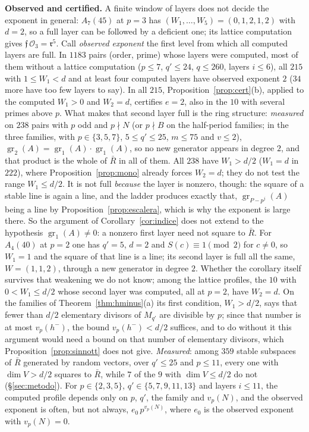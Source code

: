 \documentclass[11pt,a4paper]{article}
\theoremstyle{definition}
\newcommand{\cO}{\mathcal{O}}
\newcommand{\cf}{\mathfrak{f}}
\newcommand{\rad}{\mathfrak{r}}
\newcommand{\gr}{\operatorname{gr}}
\begin{document}
\noindent\textbf{Observed and certified.} A finite window of layers does not decide the exponent in general:
$A_7(45)$ at $p=3$ has $(W_1,\dots,W_5)=(0,1,2,1,2)$ with $d=2$, so a full layer can be followed by a deficient
one; its lattice computation gives $\cf\,\cO_3=\rad^5$. Call \emph{observed exponent} the first level from which
all computed layers are full. In $1183$ pairs (order, prime) whose layers were computed, most of them without a lattice computation
($p\le7$, $q'\le24$, $q\le260$, layers $i\le6$), all $215$ with $1\le W_1<d$ and at least four computed layers
have observed exponent $2$ ($34$ more have too few layers to say). In all $215$, Proposition~\ref{prop:cert}(b),
applied to the computed $W_1>0$ and $W_2=d$, certifies $e=2$, also in the $10$ with several primes above $p$. What
makes that second layer full is the ring structure: \emph{measured} on $238$ pairs with $p$ odd and $p\nmid N$
(or $p\nmid B$ on the half-period families; in the three families, with $p\in\{3,5,7\}$, $5\le q'\le25$, $m\le75$
and $v\le2$), $\gr_2(A)=\gr_1(A)\cdot\gr_1(A)$, so no new generator appears in degree $2$, and that product is the
whole of $\bar R$ in all of them. All $238$ have $W_1>d/2$ ($W_1=d$ in $222$), where Proposition~\ref{prop:mono}
already forces $W_2=d$; they do not test the range $W_1\le d/2$. It is not full \emph{because} the layer is nonzero, though: the square of a stable line is again a
line, and the ladder produces exactly that, $\gr_{P-p^j}(A)$ being a line by Proposition~\ref{prop:escalera}, which
is why the exponent is large there. So the argument of Corollary~\ref{cor:indice} does not extend to the
hypothesis $\gr_1(A)\neq0$: a nonzero first layer need not square to $\bar R$. For $A_4(40)$ at $p=2$ one has $q'=5$, $d=2$ and
$S(c)\equiv1\pmod2$ for $c\ne0$, so $W_1=1$ and the square of that line is a line; its second layer is full all the same,
$W=(1,1,2)$, through a new generator in degree $2$. Whether the corollary itself survives
that weakening we do not know; among the lattice profiles, the $10$ with $0<W_1\le d/2$ whose second layer
was computed, all at $p=2$, have $W_2=d$. On the families of
Theorem~\ref{thm:hminus}(a) its first condition, $W_1>d/2$, says that fewer than $d/2$ elementary divisors of $M_{q'}$
are divisible by $p$; since that number is at most $v_p(h^-)$, the bound $v_p(h^-)<d/2$ suffices, and to do without it
this argument would need a bound on that number of elementary divisors, which Proposition~\ref{prop:sinnott} does not give. \emph{Measured}: among $359$ stable subspaces of $\bar R$ generated by random
vectors, over $q'\le25$ and $p\le11$, every one with $\dim V>d/2$ squares to $\bar R$, while $7$ of the $9$ with
$\dim V\le d/2$ do not (\S\ref{sec:metodo}). For $p\in\{2,3,5\}$, $q'\in\{5,7,9,11,13\}$ and layers $i\le11$, the computed
profile depends only on $p$, $q'$, the family and $v_p(N)$, and the observed exponent is often, but not always,
$e_0\,p^{v_p(N)}$, where $e_0$ is the observed exponent with $v_p(N)=0$.
\end{document}
